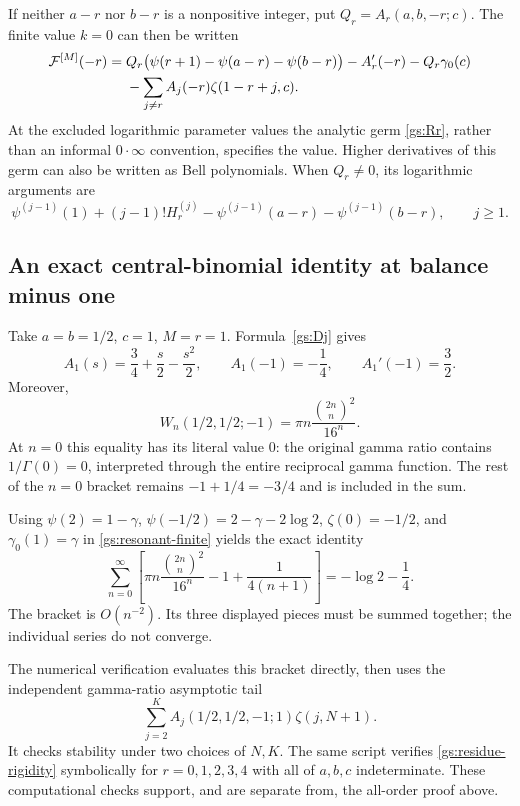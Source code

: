 If neither $a-r$ nor $b-r$ is a nonpositive integer, put
$Q_r=A_r(a,b,-r;c)$.  The finite value $k=0$ can then be written
\begin{align}
 \mathcal F^{[M]}(-r)
 ={}&Q_r\bigl(\psi(r+1)-\psi(a-r)-\psi(b-r)\bigr)
 -A_r'(-r)-Q_r\gamma_0(c)\notag\\
 &-\sum_{j\ne r}A_j(-r)\zeta(1-r+j,c).
 \label{gs:resonant-finite}
\end{align}
At the excluded logarithmic parameter values the analytic germ
\eqref{gs:Rr}, rather than an informal $0\cdot\infty$ convention,
specifies the value.  Higher derivatives of this germ can also be
written as Bell polynomials.  When $Q_r\ne0$, its logarithmic arguments
are
\[
 \psi^{(j-1)}(1)+(j-1)!H_r^{(j)}
 -\psi^{(j-1)}(a-r)-\psi^{(j-1)}(b-r),\qquad j\ge1.
\]

\subsection{An exact central-binomial identity at balance minus one}

Take $a=b=1/2$, $c=1$, $M=r=1$.  Formula~\eqref{gs:Dj} gives
\[
 A_1(s)=\frac34+\frac s2-\frac{s^2}{2},\qquad
 A_1(-1)=-\frac14,\qquad A_1'(-1)=\frac32.
\]
Moreover,
\[
 W_n(1/2,1/2;-1)=\pi n\frac{\binom{2n}{n}^2}{16^n}.
\]
At $n=0$ this equality has its literal value $0$: the original gamma
ratio contains $1/\Gamma(0)=0$, interpreted through the entire
reciprocal gamma function.  The rest of the $n=0$ bracket remains
$-1+1/4=-3/4$ and is included in the sum.

Using $\psi(2)=1-\gamma$,
$\psi(-1/2)=2-\gamma-2\log2$,
$\zeta(0)=-1/2$, and $\gamma_0(1)=\gamma$ in
\eqref{gs:resonant-finite} yields the exact identity
\begin{equation}\label{gs:central-minus-one}
 \boxed{\displaystyle
 \sum_{n=0}^{\infty}\left[
 \pi n\frac{\binom{2n}{n}^2}{16^n}
 -1+\frac1{4(n+1)}\right]
 =-\log2-\frac14.}
\end{equation}
The bracket is $O(n^{-2})$.  Its three displayed pieces must be summed
together; the individual series do not converge.

The numerical verification evaluates this bracket directly, then uses
the independent gamma-ratio asymptotic tail
\[
 \sum_{j=2}^K A_j(1/2,1/2,-1;1)\zeta(j,N+1).
\]
It checks stability under two choices of $N,K$.  The same script verifies
\eqref{gs:residue-rigidity} symbolically for $r=0,1,2,3,4$ with all of
$a,b,c$ indeterminate.  These computational checks support, and are
separate from, the all-order proof above.

